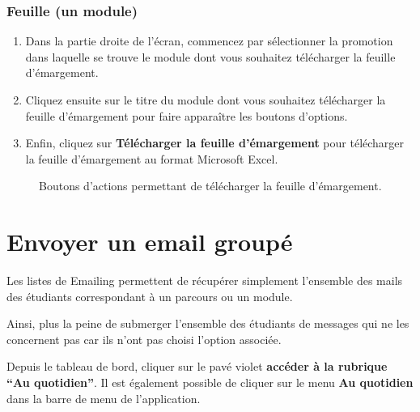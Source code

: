 \documentclass[letterpaper,10pt,french]{sphinxmanual}
\begin{document}
\subsubsection{Feuille (un module)}
\label{prof:feuille-un-module}\begin{enumerate}
\item {} 
Dans la partie droite de l'écran, commencez par sélectionner la promotion dans laquelle se trouve le module dont vous souhaitez télécharger la feuille d'émargement.

\item {} 
Cliquez ensuite sur le titre du module dont vous souhaitez télécharger la feuille d'émargement pour faire apparaître les boutons d'options.

\item {} 
Enfin, cliquez sur \textbf{Télécharger la feuille d'émargement} pour télécharger la feuille d'émargement au format Microsoft Excel.

\end{enumerate}
\begin{figure}[htbp]
\centering
\capstart

\caption{Boutons d'actions permettant de télécharger la feuille d'émargement.}\end{figure}


\section{Envoyer un email groupé}
\label{prof:envoyer-un-email-groupe}
Les listes de Emailing permettent de récupérer simplement l'ensemble des mails des étudiants correspondant à un parcours ou un module.

Ainsi, plus la peine de submerger l'ensemble des étudiants de messages qui ne les concernent pas car ils n'ont pas choisi l'option associée.

Depuis le tableau de bord, cliquer sur le pavé violet \textbf{accéder à la rubrique ``Au quotidien''}. Il est également possible de cliquer sur le menu \textbf{Au quotidien} dans la barre de menu de l'application.
\end{document}
